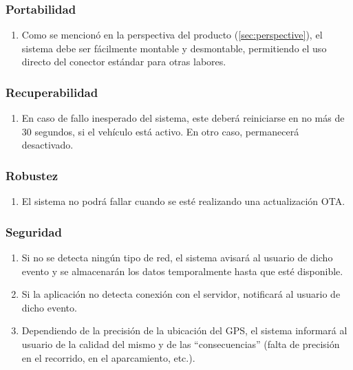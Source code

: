 \subsubsection{Portabilidad}
\begin{enumerate}[resume, label=\textbf{\texttt{RNF-\arabic*}}]
  \item\label{nf:easy-conn} Como se mencionó en la perspectiva del producto (\ref{sec:perspective}),
  el sistema debe ser fácilmente montable y desmontable, permitiendo el uso directo
  del conector estándar para otras labores.
\end{enumerate}

\subsubsection{Recuperabilidad}
\begin{enumerate}[resume, label=\textbf{\texttt{RNF-\arabic*}}]
  \item\label{nf:restart-time} En caso de fallo inesperado del sistema, este
  deberá reiniciarse en no más de 30 segundos, si el vehículo está activo. En otro
  caso, permanecerá desactivado.
\end{enumerate}

\subsubsection{Robustez}
\begin{enumerate}[resume, label=\textbf{\texttt{RNF-\arabic*}}]
  \item\label{nf:ota-strength} El sistema no podrá fallar cuando se esté realizando
  una actualización OTA.
\end{enumerate}

\subsubsection{Seguridad}
\begin{enumerate}[resume, label=\textbf{\texttt{RNF-\arabic*}}]
  \item\label{nf:err-mobile} Si no se detecta ningún tipo de red, el sistema 
  avisará al usuario de dicho evento y se almacenarán los datos temporalmente hasta
  que esté disponible.
  \item\label{nf:err-app} Si la aplicación no detecta conexión con el servidor,
  notificará al usuario de dicho evento.
  \item\label{nf:err-gps} Dependiendo de la precisión de la ubicación del GPS,
  el sistema informará al usuario de la calidad del mismo y de las ``consecuencias''
  (falta de precisión en el recorrido, en el aparcamiento, etc.).
\end{enumerate}

